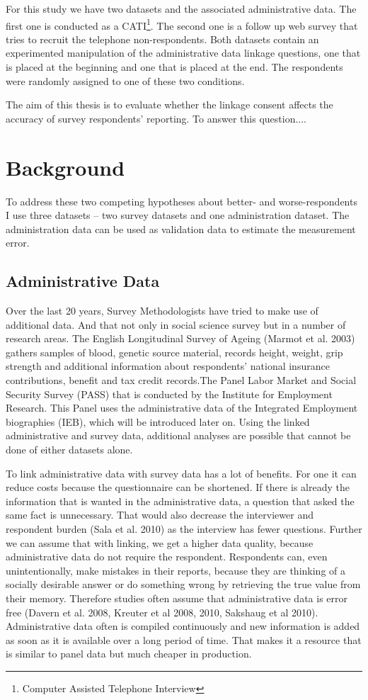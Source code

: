 For this study we have two datasets and the associated administrative data. The first one is conducted as a CATI\footnote{Computer Assisted Telephone Interview}. The second one is a follow up web survey that tries to recruit the telephone non-respondents. Both datasets contain an experimented manipulation of the administrative data linkage questions, one that is placed at the beginning and one that is placed at the end. The respondents were randomly assigned to one of these two conditions.

The aim of this thesis is to evaluate whether the linkage consent affects the accuracy of survey respondents' reporting. To answer this question.... 

\section{Background}
To address these two competing hypotheses about better- and worse-respondents I use three datasets -- two survey datasets and one administration dataset.  The administration data can be used as validation data to estimate the measurement error. 

\subsection{Administrative Data}

Over the last 20 years, Survey Methodologists have tried to make use of additional data. And that not only in social science survey but in a number of research areas. The English Longitudinal Survey of Ageing (Marmot et al. 2003) gathers samples of blood, genetic source material, records height, weight, grip strength and additional information about respondents' national insurance contributions, benefit and tax credit records.The Panel Labor Market and Social Security Survey (PASS) that is conducted by the Institute for Employment Research. This Panel uses the administrative data of the Integrated Employment biographies (IEB), which will be introduced later on. Using the linked administrative and survey data, additional analyses are possible that cannot be done of either datasets alone. 

To link administrative data with survey data has a lot of benefits. For one it can reduce costs because the questionnaire can be shortened. If there is already the information that is wanted in the administrative data, a question that asked the same fact is unnecessary. That would also decrease the interviewer and respondent burden (Sala et al. 2010) as the interview has fewer questions. Further we can assume that with linking, we get a higher data quality, because administrative data do not require the respondent. Respondents can, even unintentionally, make mistakes in their reports, because they are thinking of a socially desirable answer or do something wrong by retrieving the true value from their memory. Therefore studies often assume that administrative data is error free (Davern et al. 2008, Kreuter et al 2008, 2010, Sakshaug et al 2010). Administrative data often is compiled continuously and new information is added as soon as it is available  over a long period of time. That makes it a resource that is similar to panel data but much cheaper in production.

